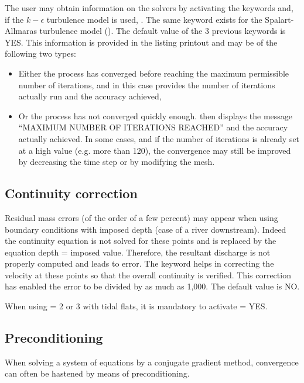 The user may obtain information on the solvers by activating the keywords
 and, if the $k-\epsilon$ turbulence model
is used, .
The same keyword exists for the Spalart-Allmaras turbulence model
().
The default value of the 3 previous keywords is YES.
This information is provided in the listing printout
and may be of the following two types:
\begin{itemize}
\item Either the process has converged before reaching the maximum permissible
number of iterations, and in this case  provides the number of
iterations actually run and the accuracy achieved,
\item Or the process has not converged quickly enough.
 then displays the message ``MAXIMUM NUMBER OF ITERATIONS REACHED''
and the accuracy actually achieved.
In some cases, and if the number of iterations is already set
at a high value (e.g. more than 120), the convergence may still be improved
by decreasing the time step or by modifying the mesh.
\end{itemize}

\subsection{Continuity correction}

Residual mass errors (of the order of a few percent) may appear when using
boundary conditions with imposed depth (case of a river downstream).
Indeed the continuity equation is not solved for these points and is replaced
by the equation depth = imposed value.
Therefore, the resultant discharge is not properly computed and leads to error.
The keyword  helps in correcting the velocity
at these points so that the overall continuity is verified.
This correction has enabled the error to be divided by as much as 1,000.
The default value is NO.

When using  = 2 or 3 with tidal flats,
it is mandatory to activate  = YES.


\subsection{Preconditioning}

When solving a system of equations by a conjugate gradient method,
convergence can often be hastened by means of preconditioning.

